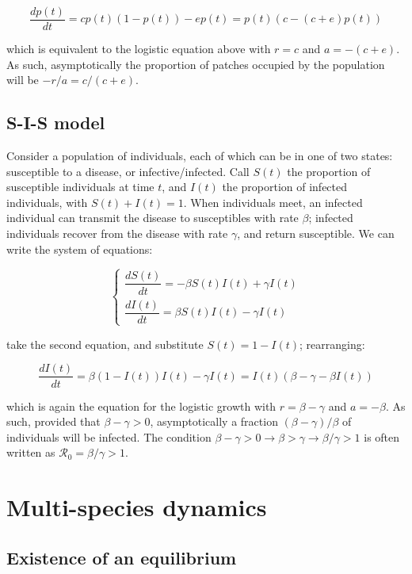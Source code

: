 \documentclass[]{book}
\begin{document}
\[
\dfrac{d p(t)}{dt} = c p(t)(1 - p(t)) - e p(t) = p(t) (c - (c + e) p(t))
\]

which is equivalent to the logistic equation above with \(r = c\) and \(a = -(c+e)\). As such, asymptotically the proportion of patches occupied by the population will be \(-r/a = c / (c + e)\).

\hypertarget{s-i-s-model}{%
\subsection{S-I-S model}\label{s-i-s-model}}

Consider a population of individuals, each of which can be in one of two states: susceptible to a disease, or infective/infected. Call \(S(t)\) the proportion of susceptible individuals at time \(t\), and \(I(t)\) the proportion of infected individuals, with \(S(t) + I(t) = 1\). When individuals meet, an infected individual can transmit the disease to susceptibles with rate \(\beta\); infected individuals recover from the disease with rate \(\gamma\), and return susceptible. We can write the system of equations:

\[
\begin{cases}
\dfrac{d S(t)}{dt} = -\beta S(t) I(t) + \gamma I(t)\\
\dfrac{d I(t)}{dt} = \beta S(t) I(t) - \gamma I(t)
\end{cases}
\]

take the second equation, and substitute \(S(t) = 1 - I(t)\); rearranging:

\[
\dfrac{d I(t)}{dt} = \beta (1-I(t)) I(t) - \gamma I(t) = I(t)(\beta - \gamma -\beta I(t))
\]

which is again the equation for the logistic growth with \(r = \beta - \gamma\) and \(a = -\beta\). As such, provided that \(\beta -\gamma > 0\), asymptotically a fraction \((\beta - \gamma) / \beta\) of individuals will be infected. The condition \(\beta -\gamma > 0 \to \beta > \gamma \to \beta/ \gamma > 1\) is often written as \(\mathcal R_0 = \beta/ \gamma > 1\).

\hypertarget{multi-species-dynamics}{%
\section{Multi-species dynamics}\label{multi-species-dynamics}}

\hypertarget{existence-of-an-equilibrium}{%
\subsection{Existence of an equilibrium}\label{existence-of-an-equilibrium}}
\end{document}
